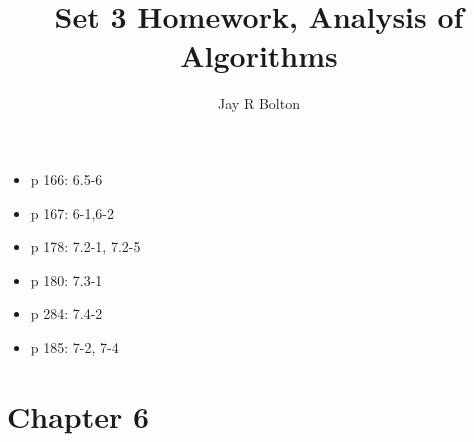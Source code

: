 \documentclass{article}
\title{Set 3 Homework, Analysis of Algorithms}
\author{Jay R Bolton}
\begin{document}
\maketitle

\begin{itemize}
\item p 166: 6.5-6
\item p 167: 6-1,6-2
\item p 178: 7.2-1, 7.2-5
\item p 180: 7.3-1
\item p 284: 7.4-2
\item p 185: 7-2, 7-4
\end{itemize}


\section*{Chapter 6}
\end{document}
